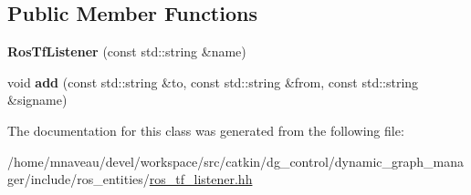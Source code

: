 \subsection*{Public Member Functions}
\begin{DoxyCompactItemize}
\item 
{\bfseries Ros\+Tf\+Listener} (const std\+::string \&name)\hypertarget{classdynamic__graph_1_1RosTfListener_a475236fb89bcd8c28b28822344f6b5da}{}\label{classdynamic__graph_1_1RosTfListener_a475236fb89bcd8c28b28822344f6b5da}

\item 
void {\bfseries add} (const std\+::string \&to, const std\+::string \&from, const std\+::string \&signame)\hypertarget{classdynamic__graph_1_1RosTfListener_ad886b7323f3f7df3171e8f3be8a7218a}{}\label{classdynamic__graph_1_1RosTfListener_ad886b7323f3f7df3171e8f3be8a7218a}

\end{DoxyCompactItemize}


The documentation for this class was generated from the following file\+:\begin{DoxyCompactItemize}
\item 
/home/mnaveau/devel/workspace/src/catkin/dg\+\_\+control/dynamic\+\_\+graph\+\_\+manager/include/ros\+\_\+entities/\hyperlink{ros__tf__listener_8hh}{ros\+\_\+tf\+\_\+listener.\+hh}\end{DoxyCompactItemize}
